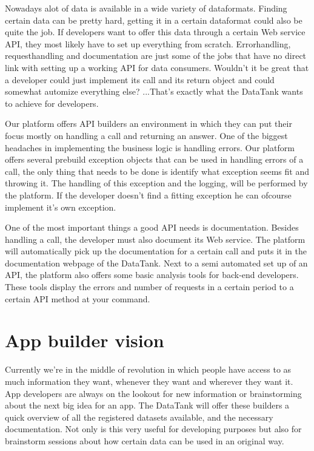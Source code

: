 \documentclass[12pt]{book}
\begin{document}
Nowadays alot of data is available in a wide variety of dataformats. Finding certain data can be pretty hard, getting it in a certain dataformat could also be quite the job. If developers want to offer this data through a certain Web service API, they most likely have to set up everything from scratch. Errorhandling, requesthandling and documentation are just some of the jobs that have no direct link with setting up a working API for data consumers. Wouldn't it be great that a developer could just implement its call and its return object and could somewhat automize everything else? ...That's exactly what the DataTank wants to achieve for developers.

Our platform offers API builders an environment in which they can put their focus mostly on handling a call and returning an answer. One of the biggest headaches in implementing the business logic is handling errors. Our platform offers several prebuild exception objects that can be used in handling errors of a call, the only thing that needs to be done is identify what exception seems fit and throwing it. The handling of this exception and the logging, will be performed by the platform. If the developer doesn't find a fitting exception he can ofcourse implement it's own exception.

One of the most important things a good API needs is documentation. Besides handling a call, the developer must also document its Web service. The platform will automatically pick up the documentation for a certain call and puts it in the documentation webpage of the DataTank.
Next to a semi automated set up of an API, the platform also offers some basic analysis tools for back-end developers. These tools display the errors and number of requests in a certain period to a certain API method at your command.

\section{App builder vision }
Currently we're in the middle of revolution in which people have access to as much information they want, whenever they want and wherever they want it. App developers are always on the lookout for new information or brainstorming about the next big idea for an app. The DataTank will offer these builders a quick overview of all the registered datasets available, and the necessary documentation. Not only is this very useful for developing purposes but also for brainstorm sessions about how certain data can be used in an original way.
\end{document}
